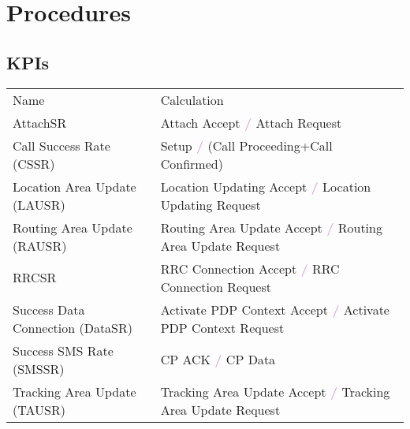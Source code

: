 \chapter{Procedures}

%

\clearpage
\section{KPIs}
\begin{center}
\begin{tabular}{ll}
\rowcolor{Plum!20}
Name & Calculation \\
AttachSR & Attach Accept \textcolor{Plum}{\textbf{/}} Attach Request\\
\rowcolor{Gray!20}
Call Success Rate (CSSR) & Setup \textcolor{Plum}{\textbf{/}} (Call Proceeding+Call Confirmed)\\
Location Area Update (LAUSR) & Location Updating Accept \textcolor{Plum}{\textbf{/}} Location Updating Request\\
\rowcolor{Gray!20}
Routing Area Update (RAUSR) & Routing Area Update Accept \textcolor{Plum}{\textbf{/}} Routing Area Update Request\\
RRCSR & RRC Connection Accept \textcolor{Plum}{\textbf{/}} RRC Connection Request\\
\rowcolor{Gray!20}
Success Data Connection (DataSR) & Activate PDP Context Accept \textcolor{Plum}{\textbf{/}} Activate PDP Context Request\\
Success SMS Rate (SMSSR) & CP ACK \textcolor{Plum}{\textbf{/}} CP Data\\
\rowcolor{Gray!20}
Tracking Area Update (TAUSR) & Tracking Area Update Accept \textcolor{Plum}{\textbf{/}} Tracking Area Update Request\\
\end{tabular}
\end{center}

\clearpage
{}

